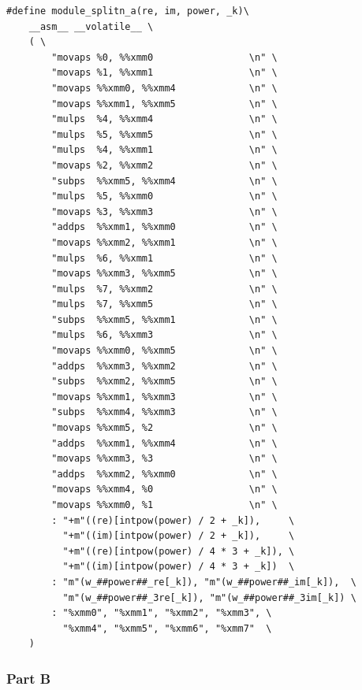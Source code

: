 \documentclass[a4paper]{report}
\begin{document}
    \lstset{language = c, tabsize = 4}
    \begin{lstlisting}
#define module_splitn_a(re, im, power, _k)\
    __asm__ __volatile__ \
    ( \
        "movaps %0, %%xmm0                 \n" \
        "movaps %1, %%xmm1                 \n" \
        "movaps %%xmm0, %%xmm4             \n" \
        "movaps %%xmm1, %%xmm5             \n" \
        "mulps  %4, %%xmm4                 \n" \
        "mulps  %5, %%xmm5                 \n" \
        "mulps  %4, %%xmm1                 \n" \
        "movaps %2, %%xmm2                 \n" \
        "subps  %%xmm5, %%xmm4             \n" \
        "mulps  %5, %%xmm0                 \n" \
        "movaps %3, %%xmm3                 \n" \
        "addps  %%xmm1, %%xmm0             \n" \
        "movaps %%xmm2, %%xmm1             \n" \
        "mulps  %6, %%xmm1                 \n" \
        "movaps %%xmm3, %%xmm5             \n" \
        "mulps  %7, %%xmm2                 \n" \
        "mulps  %7, %%xmm5                 \n" \
        "subps  %%xmm5, %%xmm1             \n" \
        "mulps  %6, %%xmm3                 \n" \
        "movaps %%xmm0, %%xmm5             \n" \
        "addps  %%xmm3, %%xmm2             \n" \
        "subps  %%xmm2, %%xmm5             \n" \
        "movaps %%xmm1, %%xmm3             \n" \
        "subps  %%xmm4, %%xmm3             \n" \
        "movaps %%xmm5, %2                 \n" \
        "addps  %%xmm1, %%xmm4             \n" \
        "movaps %%xmm3, %3                 \n" \
        "addps  %%xmm2, %%xmm0             \n" \
        "movaps %%xmm4, %0                 \n" \
        "movaps %%xmm0, %1                 \n" \
        : "+m"((re)[intpow(power) / 2 + _k]),     \
          "+m"((im)[intpow(power) / 2 + _k]),     \
          "+m"((re)[intpow(power) / 4 * 3 + _k]), \
          "+m"((im)[intpow(power) / 4 * 3 + _k])  \
        : "m"(w_##power##_re[_k]), "m"(w_##power##_im[_k]),  \
          "m"(w_##power##_3re[_k]), "m"(w_##power##_3im[_k]) \
        : "%xmm0", "%xmm1", "%xmm2", "%xmm3", \
          "%xmm4", "%xmm5", "%xmm6", "%xmm7"  \
    )
    \end{lstlisting}

\subsubsection{Part B} \indent
\end{document}
